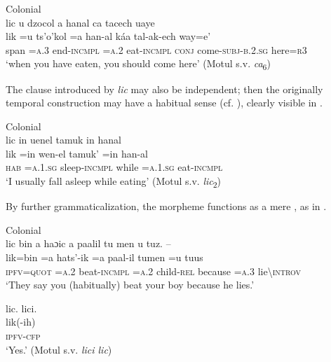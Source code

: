 \documentclass[output=paper]{langsci/langscibook}
\begin{document}
\ea\label{ex:lehmann:25}
Colonial  \\
      lic  u      dzocol      a      hanal      ca      tacech              uaye\\
\gll   lik   =u     ts'o’kol     =a    han-al      káa     tal-ak-ech        way=e'\\
span  =\textsc{a.3}   end-\textsc{incmpl }   \textsc{=a.2}   eat-\textsc{incmpl}  \textsc{conj}    come-\textsc{subj-b.2.sg}    here=\textsc{r3}\\
\glt ‘when you have eaten, you should come here’ (Motul s.v. \textit{ca}{\textsubscript{6}})
\z



The clause introduced by \textit{lic} may also be independent; then the originally temporal construction may have a habitual sense (cf. \citealt[67]{Coronel1620}), clearly visible in .


\ea\label{ex:lehmann:26}
Colonial  \\
      lic  in        uenel        tamuk    in        hanal\\
\gll         lik  =in      wen-el        tamuk'    =in      han-al\\
\textsc{hab}  \textsc{=a.1.sg}    sleep-\textsc{incmpl}  while    =\textsc{a.1.sg}    eat-\textsc{incmpl}\\
\glt ‘I usually fall asleep while eating’ (Motul s.v. \textit{lic}\textsubscript{2})
\z



By further grammaticalization, the morpheme functions as a mere  , as in .


\ea\label{ex:lehmann:27}
Colonial  \\
      lic bin      a      haɔic      a      paalil    tu  men    u        tuz.  –\\
\gll   lik=bin    =a    hats’-ik    =a    paal-il    tumen    =u    tuus\\
\textsc{ipfv=quot}  \textsc{=a.2}    beat-\textsc{incmpl}  \textsc{=a.2}   child-\textsc{rel}  because  =\textsc{a.3}    lie{\textbackslash}\textsc{introv}\\
\glt ‘They say you (habitually) beat your boy because he lies.’

  lic. lici.\\
\gll        lik(-ih)\\
\textsc{ipfv-cfp} \\
\glt ‘Yes.’ (Motul s.v. \textit{lici lic})
\z
\end{document}
